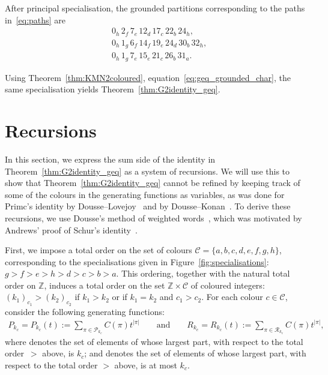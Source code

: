 \documentclass[pdftex]{sigma}
\numberwithin{equation}{section}
\theoremstyle{definition}
\newcommand{\Z}{\mathbb{Z}}
\begin{document}
After principal specialisation, the grounded partitions corresponding to the paths in~\eqref{eq:paths} are
\begin{align*}
&0_h\,2_f\,7_e\,12_d\,17_c\,22_b\,24_h,\\
&0_h\,1_g\,6_f\,14_f\,19_e\,24_d\,30_b\,32_h,\\
&0_h\,1_g\,7_e\,15_e\,21_c\,26_b\,31_a.
\end{align*}

Using Theorem~\ref{thm:KMN2coloured}, equation~\eqref{eq:geq_grounded_char}, the same specialisation yields Theorem~\ref{thm:G2identity_geq}.

\section{Recursions}\label{section:recursions}

In this section, we express the sum side of the identity in Theorem~\ref{thm:G2identity_geq} as a system of recursions. We will use this to show that Theorem~\ref{thm:G2identity_geq} cannot be refined by keeping track of some of the colours in the generating functions as variables, as was done for Primc's identity by Dousse--Lovejoy~\cite{DL18} and by Dousse--Konan~\cite{DK22a}. To derive these recursions, we use Dousse's method of weighted words~\cite{D17}, which was motivated by Andrews' proof of Schur's identity~\cite{And67}.

First, we impose a total order on the set of colours $\mathcal{C}=\{a,b,c,d,e,f,g,h\}$, corresponding to the specialisations given in Figure~\ref{fig:specialisations}: $g > f > e > h > d > c > b > a$. This ordering, together with the natural total order on $\Z$, induces a total order on the set $\mathbb{Z}\times \mathcal{C}$ of coloured integers: $(k_1)_{c_1}>(k_2)_{c_2}$ if $k_1>k_2$ or if $k_1=k_2$ and $c_1>c_2$. For each colour $c \in \mathcal{C}$, consider the following generating functions:
\begin{align*}
P_{k_c} = P_{k_c}(t) := \sum_{\pi \in \mathcal{P}_{k_c}} C(\pi)t^{|\pi|} \qquad \text{and} \qquad R_{k_c} = R_{k_c}(t) := \sum_{\pi \in \mathcal{R}_{k_c}}C(\pi)t^{|\pi|},
\end{align*}
where  denotes the set of elements of  whose largest part, with respect to the total order~$>$ above, is $k_c$; and  denotes the set of elements of  whose largest part, with respect to the total order $>$ above, is at most $k_c$.
\end{document}
